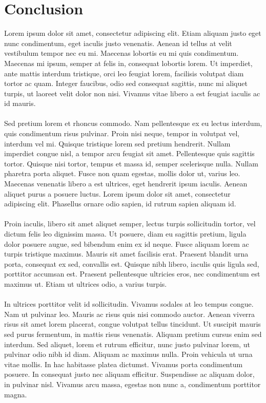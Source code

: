 \documentclass[11pt,a4paper]{article}
\begin{document}
\section{Conclusion}
Lorem ipsum dolor sit amet, consectetur adipiscing elit. Etiam aliquam justo eget nunc condimentum, eget iaculis justo venenatis. Aenean id tellus at velit vestibulum tempor nec eu mi. Maecenas lobortis eu mi quis condimentum. Maecenas mi ipsum, semper at felis in, consequat lobortis lorem. Ut imperdiet, ante mattis interdum tristique, orci leo feugiat lorem, facilisis volutpat diam tortor ac quam. Integer faucibus, odio sed consequat sagittis, nunc mi aliquet turpis, ut laoreet velit dolor non nisi. Vivamus vitae libero a est feugiat iaculis ac id mauris.\\
\\
Sed pretium lorem et rhoncus commodo. Nam pellentesque ex eu lectus interdum, quis condimentum risus pulvinar. Proin nisi neque, tempor in volutpat vel, interdum vel mi. Quisque tristique lorem sed pretium hendrerit. Nullam imperdiet congue nisl, a tempor arcu feugiat sit amet. Pellentesque quis sagittis tortor. Quisque nisi tortor, tempus et massa id, semper scelerisque nulla. Nullam pharetra porta aliquet. Fusce non quam egestas, mollis dolor ut, varius leo. Maecenas venenatis libero a est ultrices, eget hendrerit ipsum iaculis. Aenean aliquet purus a posuere luctus. Lorem ipsum dolor sit amet, consectetur adipiscing elit. Phasellus ornare odio sapien, id rutrum sapien aliquam id.\\
\\
Proin iaculis, libero sit amet aliquet semper, lectus turpis sollicitudin tortor, vel dictum felis leo dignissim massa. Ut posuere, diam eu sagittis pretium, ligula dolor posuere augue, sed bibendum enim ex id neque. Fusce aliquam lorem ac turpis tristique maximus. Mauris sit amet facilisis erat. Praesent blandit urna porta, consequat ex sed, convallis est. Quisque nibh libero, iaculis quis ligula sed, porttitor accumsan est. Praesent pellentesque ultricies eros, nec condimentum est maximus ut. Etiam ut ultrices odio, a varius turpis.\\
\\
In ultrices porttitor velit id sollicitudin. Vivamus sodales at leo tempus congue. Nam ut pulvinar leo. Mauris ac risus quis nisi commodo auctor. Aenean viverra risus sit amet lorem placerat, congue volutpat tellus tincidunt. Ut suscipit mauris sed purus fermentum, in mattis risus venenatis. Aliquam pretium cursus enim sed interdum. Sed aliquet, lorem et rutrum efficitur, nunc justo pulvinar lorem, ut pulvinar odio nibh id diam. Aliquam ac maximus nulla. Proin vehicula ut urna vitae mollis. In hac habitasse platea dictumst. Vivamus porta condimentum posuere. In consequat justo nec aliquam efficitur. Suspendisse ac aliquam dolor, in pulvinar nisl. Vivamus arcu massa, egestas non nunc a, condimentum porttitor magna.\\
\end{document}
